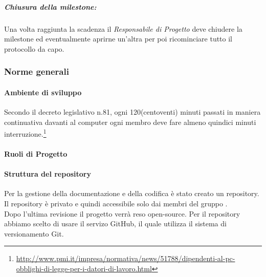 		\subparagraph{Chiusura della milestone:}
		
		Una volta raggiunta la scadenza il \textit{Responsabile di Progetto} deve chiudere la \gls{milestone} ed eventualmente aprirne un'altra per poi ricominciare tutto il protocollo da capo.

\newpage
\subsubsection{Norme generali}
	\paragraph{Ambiente di sviluppo}
	Secondo il decreto legislativo n.81, ogni 120(centoventi) minuti passati in maniera continuativa davanti al computer ogni membro deve fare almeno quindici minuti interruzione.\footnote{\url{http://www.pmi.it/impresa/normativa/news/51788/dipendenti-al-pc-obblighi-di-legge-per-i-datori-di-lavoro.html}}

	\paragraph{Ruoli di Progetto}
	
	
\newpage
	\paragraph{Struttura del repository} \label{repository}
	Per la gestione della documentazione e della codifica è stato creato un \gls{repository}. Il \gls{repository} è privato e quindi accessibile solo dai membri del gruppo \GRUPPO.\\
	Dopo l'ultima revisione il progetto verrà reso open-source.
	Per il \gls{repository} abbiamo scelto di usare il servizo \gls{GitHub}, il quale utilizza il sistema di \gls{versionamento} \gls{Git}.
	
